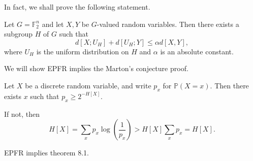 \documentclass[12pt]{article}
\begin{document}
In fact, we shall prove the following statement.

\begin{theorem}[EPFR]
	Let $G = \mathbb{F}_2^{n}$ and let $X, Y$ be $G$-valued random variables. Then there exists a subgroup $H$ of $G$ such that
	\[
		d[X; U_H] + d[U_H; Y] \leq \alpha d[X, Y],
	\]
	where $U_H$ is the uniform distribution on $H$ and $\alpha$ is an absolute constant.
\end{theorem}

We will show EPFR implies the Marton's conjecture proof.

\begin{lemma}
	Let $X$ be a discrete random variable, and write $p_x$ for $\mathbb{P}(X = x)$. Then there exists $x$ such that $p_x \geq 2^{-H[X]}$.
\end{lemma}

\begin{proofbox}
	If not, then
	\[
		H[X] = \sum_x p_x \log \left( \frac{1}{p_x} \right) > H[X] \sum_x p_x = H[X].
	\]
\end{proofbox}

\begin{proposition}
	EPFR implies theorem 8.1.
\end{proposition}
\end{document}
